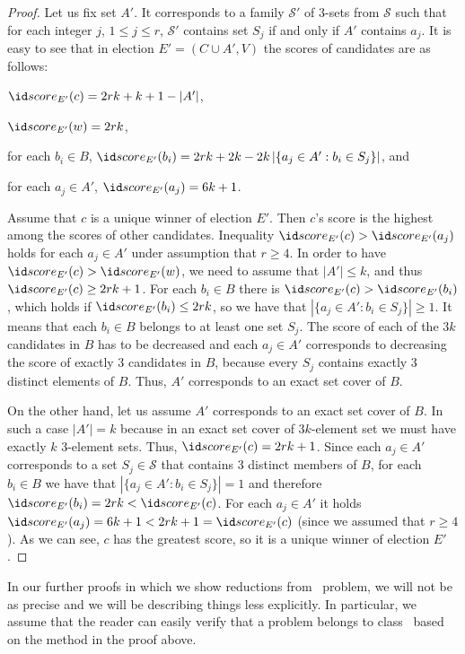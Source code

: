 \begin{proof}
Let us fix set $A'$.
It corresponds to a family $\mathcal{S'}$ of 3-sets from $\mathcal{S}$ such that for each integer $j$, $1\le j\le r$, $\mathcal{S'}$ contains set $S_j$ if and only if $A'$ contains $a_j$.
It is easy to see that in election $E'=(C\cup A',V)$ the scores of candidates are as follows:
\begin{Enumerate}
	\item $\score{E'}(c)=2rk+k+1-|A'|$,
	\item $\score{E'}(w)=2rk$,
	\item for each $b_i\in B$, $\score{E'}(b_i)=2rk+2k-2k\,|\{a_j\in A':b_i\in S_j\}|$, and
	\item for each $a_j\in A'$, $\score{E'}(a_j)=6k+1$.
\end{Enumerate}
Assume that $c$ is a unique winner of election $E'$.
Then $c$'s score is the highest among the scores of other candidates.
Inequality $\score{E'}(c)>\score{E'}(a_j)$ holds for each $a_j\in A'$ under assumption that $r\ge4$.
In order to have $\score{E'}(c)>\score{E'}(w)$, we need to assume that $|A'|\le k$, and thus $\score{E'}(c)\ge2rk+1$.
For each $b_i\in B$ there is $\score{E'}(c)>\score{E'}(b_i)$, which holds if $\score{E'}(b_i)\le2rk$, so we have that $|\{a_j\in A':b_i\in S_j\}|\ge1$.
It means that each $b_i\in B$ belongs to at least one set $S_j$.
The score of each of the $3k$ candidates in $B$ has to be decreased and each $a_j\in A'$ corresponds to decreasing the score of exactly 3 candidates in $B$, because every $S_j$ contains exactly 3 distinct elements of $B$.
Thus, $A'$ corresponds to an exact set cover of $B$.

On the other hand, let us assume $A'$ corresponds to an exact set cover of $B$.
In such a case $|A'|=k$ because in an exact set cover of $3k$-element set we must have exactly $k$ 3-element sets.
Thus, $\score{E'}(c)=2rk+1$.
Since each $a_j\in A'$ corresponds to a set $S_j\in\mathcal{S}$ that contains 3 distinct members of $B$, for each $b_i\in B$ we have that $|\{a_j\in A':b_i\in S_j\}|=1$ and therefore $\score{E'}(b_i)=2rk<\score{E'}(c)$.
For each $a_j\in A'$ it holds $\score{E'}(a_j)=6k+1<2rk+1=\score{E'}(c)$ (since we assumed that $r\ge4$).
As we can see, $c$ has the greatest score, so it is a unique winner of election $E'$.
\end{proof}

In our further proofs in which we show reductions from \sharpXthreeC\ problem, we will not be as precise and we will be describing things less explicitly.
In particular, we assume that the reader can easily verify that a problem belongs to class \sharpPclass\ based on the method in the proof above.

